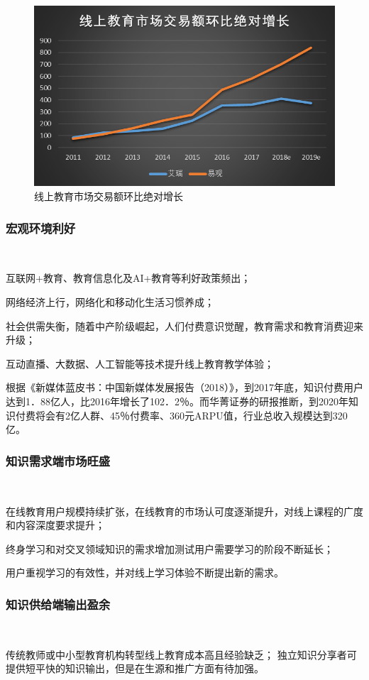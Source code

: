 \begin{figure}[H]
	\centering
	\includegraphics[width=0.9\columnwidth]{figures/online_education}
	\caption{线上教育市场交易额环比绝对增长}
	\label{fg:online_education}
\end{figure}

\subsubsection{宏观环境利好}\

互联网+教育、教育信息化及AI+教育等利好政策频出；

网络经济上行，网络化和移动化生活习惯养成；

社会供需失衡，随着中产阶级崛起，人们付费意识觉醒，教育需求和教育消费迎来升级；

互动直播、大数据、人工智能等技术提升线上教育教学体验；

根据《新媒体蓝皮书：中国新媒体发展报告（2018）》，到2017年底，知识付费用户达到1．88亿人，比2016年增长了102．2％。而华菁证券的研报推断，到2020年知识付费将会有2亿人群、45％付费率、360元ARPU值，行业总收入规模达到320亿。

\subsubsection{知识需求端市场旺盛}\

在线教育用户规模持续扩张，在线教育的市场认可度逐渐提升，对线上课程的广度和内容深度要求提升；

终身学习和对交叉领域知识的需求增加测试用户需要学习的阶段不断延长；

用户重视学习的有效性，并对线上学习体验不断提出新的需求。

\subsubsection{知识供给端输出盈余}\

传统教师或中小型教育机构转型线上教育成本高且经验缺乏；
独立知识分享者可提供短平快的知识输出，但是在生源和推广方面有待加强。
















